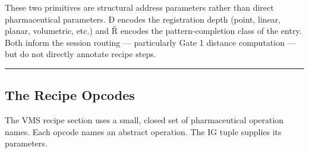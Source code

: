 These two primitives are structural address parameters rather than
direct pharmaceutical parameters. Ð encodes the registration depth
(point, linear, planar, volumetric, etc.) and Ř encodes the
pattern-completion class of the entry. Both inform the session routing
--- particularly Gate 1 distance computation --- but do not directly
annotate recipe steps.

\begin{center}\rule{0.5\linewidth}{0.5pt}\end{center}

\hypertarget{the-recipe-opcodes}{%
\subsection{The Recipe Opcodes}\label{the-recipe-opcodes}}

The VMS recipe section uses a small, closed set of pharmaceutical
operation names. Each opcode names an abstract operation. The IG tuple
supplies its parameters.

